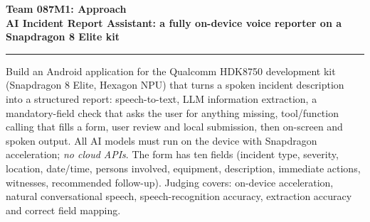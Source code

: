 \documentclass[10pt,a4paper]{article}
\newcommand{\hsec}[1]{\par\vspace{4pt}{\large\bfseries #1}\par\nobreak\vspace{1pt}\hrule\vspace{3pt}}
\begin{document}
{\LARGE\bfseries Team 087}\hfill{\large\bfseries M1: Approach}\\[2pt]
{\large\bfseries AI Incident Report Assistant: a fully on-device voice reporter on a Snapdragon 8 Elite kit}\par
\hsec{1. Problem statement and our understanding}
Build an Android application for the Qualcomm HDK8750 development kit (Snapdragon 8 Elite, Hexagon NPU) that turns a spoken incident description into a structured report: speech-to-text, LLM information extraction, a mandatory-field check that asks the user for anything missing, tool/function calling that fills a form, user review and local submission, then on-screen and spoken output. All AI models must run on the device with Snapdragon acceleration; \emph{no cloud APIs}. The form has ten fields (incident type, severity, location, date/time, persons involved, equipment, description, immediate actions, witnesses, recommended follow-up). Judging covers: on-device acceleration, natural conversational speech, speech-recognition accuracy, extraction accuracy and correct field mapping.
\end{document}
